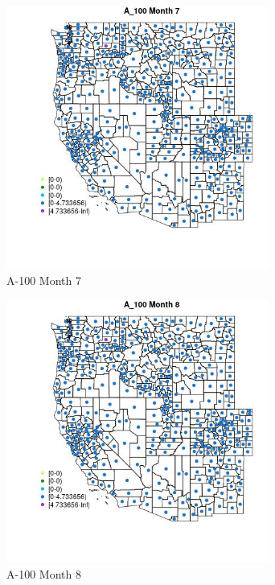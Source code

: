 \begin{figure} 
\centering  
\includegraphics[width=0.77\textwidth]{Code_Outputs/df_report_ML_predictors_CountyCentroid_Locations_Dates_2008-01-01to2018-12-31_MapObsMo7A_100.jpg} 
\caption{\label{fig:df_report_ML_predictors_CountyCentroid_Locations_Dates_2008-01-01to2018-12-31MapObsMo7A_100}A-100 Month 7} 
\end{figure} 
 

\begin{figure} 
\centering  
\includegraphics[width=0.77\textwidth]{Code_Outputs/df_report_ML_predictors_CountyCentroid_Locations_Dates_2008-01-01to2018-12-31_MapObsMo8A_100.jpg} 
\caption{\label{fig:df_report_ML_predictors_CountyCentroid_Locations_Dates_2008-01-01to2018-12-31MapObsMo8A_100}A-100 Month 8} 
\end{figure} 
 

